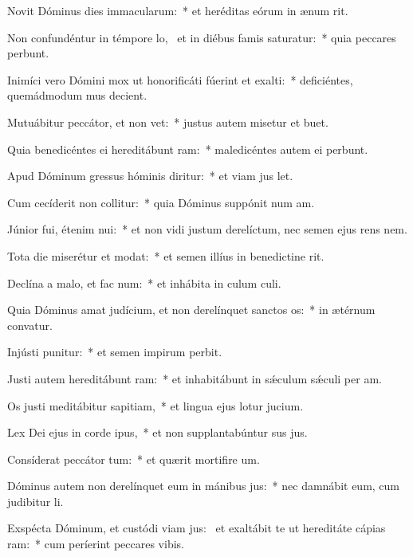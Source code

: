 \item Novit Dóminus dies immacularum:~* et heréditas eórum in ænum rit.
\item Non confundéntur in témpore lo,~\pscross{} et in diébus famis saturatur:~* quia peccares perbunt.
\item Inimíci vero Dómini mox ut honorificáti fúerint et exalti:~* deficiéntes, quemádmodum mus decient.
\item Mutuábitur peccátor, et non vet:~* justus autem misetur et buet.
\item Quia benedicéntes ei hereditábunt ram:~* maledicéntes autem ei perbunt.
\item Apud Dóminum gressus hóminis diritur:~* et viam jus let.
\item Cum cecíderit non collitur:~* quia Dóminus suppónit num am.
\item Júnior fui, étenim nui:~* et non vidi justum derelíctum, nec semen ejus rens nem.
\item Tota die miserétur et modat:~* et semen illíus in benedictine rit.
\item Declína a malo, et fac num:~* et inhábita in culum culi.
\item Quia Dóminus amat judícium, et non derelínquet sanctos os:~* in ætérnum convatur.
\item Injústi punitur:~* et semen impirum perbit.
\item Justi autem hereditábunt ram:~* et inhabitábunt in sǽculum sǽculi per am.
\item Os justi meditábitur sapitiam,~* et lingua ejus lotur jucium.
\item Lex Dei ejus in corde ipus,~* et non supplantabúntur sus jus.
\item Consíderat peccátor tum:~* et quærit mortifire um.
\item Dóminus autem non derelínquet eum in mánibus jus:~* nec damnábit eum, cum judibitur li.
\item Exspécta Dóminum, et custódi viam jus:~\pscross{} et exaltábit te ut hereditáte cápias ram:~* cum períerint peccares vibis.
